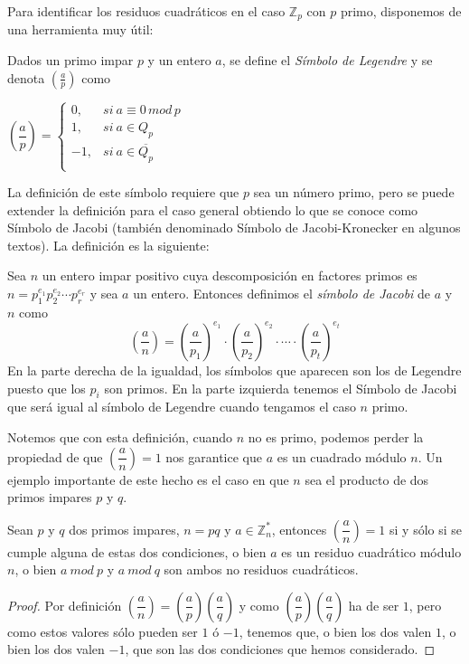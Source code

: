 Para identificar los residuos cuadráticos en el caso ${\mathbb Z}_p$ con $p$ primo, disponemos de una herramienta muy útil:

\begin{definition}
	Dados un primo impar $p$ y un entero $a$, se define el {\em Símbolo de Legendre} y se denota $\left( \frac{a}{p} \right) $ como

	\begin{center}
		$
		\left( \dfrac{a}{p} \right) =
		\begin{cases}
			0, & si\ a \equiv 0 \, mod \, p\\
			1, & si\ a \in Q_p  \\
			-1, & si\ a \in \overline{Q_p} \\
		\end{cases}
		$
	\end{center}
\end{definition}

La definici\'on de este s\'imbolo requiere que $p$ sea un n\'umero primo, pero se puede extender la definici\'on para el caso general obtiendo lo que se conoce
como S\'imbolo de Jacobi (tambi\'en denominado S\'imbolo de Jacobi-Kronecker en algunos textos). La definici\'on es la siguiente:

\begin{definition}
Sea $n$ un entero impar positivo cuya descomposici\'on en factores primos es $n = p_1^{e_1} p_2^{e_2} \cdots p_r^{e_r}$ y sea $a$ un entero. Entonces definimos
el \textit{s\'imbolo de Jacobi} de $a$ y $n$ como
\[\left( \dfrac{a}{n} \right) = \left( \dfrac{a}{p_1} \right)^{e_1} \cdot \left( \dfrac{a}{p_2} \right)^{e_2} \cdot \cdots \cdot \left( \dfrac{a}{p_t} \right)^{e_t}\]
En la parte derecha de la igualdad, los s\'imbolos que aparecen son los de Legendre puesto que los $p_i$ son primos. En la parte izquierda tenemos el S\'imbolo de Jacobi
que ser\'a igual al s\'imbolo de Legendre cuando tengamos el caso $n$ primo.
\end{definition}

Notemos que con esta definici\'on, cuando $n$ no es primo, podemos perder la propiedad de que $\left( \dfrac{a}{n} \right) = 1$ nos garantice que $a$ es un cuadrado m\'odulo $n$.
Un ejemplo importante de este hecho es el caso en que $n$ sea el producto de dos primos impares $p$ y $q$.

\begin{proposition}
\label{propResiduosPQ}
Sean $p$ y $q$ dos primos impares, $n = pq$ y $a \in {\mathbb Z}_n^*$, entonces $\left( \dfrac{a}{n} \right) = 1$ si y s\'olo si se cumple alguna de estas dos condiciones, o
bien $a$ es un residuo cuadr\'atico m\'odulo $n$, o bien $a~mod~p$ y $a~mod~q$ son ambos no residuos cuadr\'aticos.
\end{proposition}
\begin{proof}
Por definici\'on $\left( \dfrac{a}{n} \right) = \left( \dfrac{a}{p} \right) \left( \dfrac{a}{q} \right)$ y como $\left( \dfrac{a}{p} \right) \left( \dfrac{a}{q} \right)$
ha de ser $1$, pero como estos valores s\'olo pueden ser $1$ \'o $-1$, tenemos que, o bien los dos valen $1$, o bien los dos valen $-1$, que son las dos condiciones que hemos considerado.
\end{proof}


